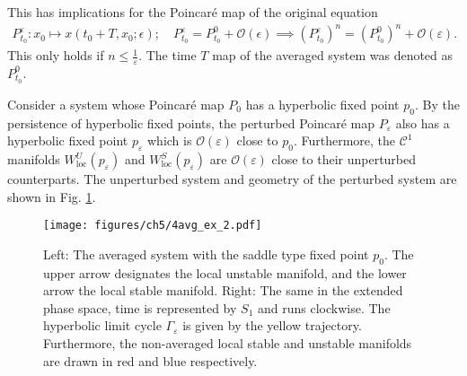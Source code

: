 This has implications for the Poincaré map of the original equation
\begin{align}
	P_{t_0}^{\varepsilon}:x_0 \mapsto x(t_0+T, x_0; \epsilon);\quad P_{t_0}^{\varepsilon} = P_{t_0}^{0} + \mathcal{O}(\epsilon) \implies \left( P_{t_0}^{\varepsilon}\right)^{n} = \left( P_{t_0}^{0}\right)^{n} + \mathcal{O}(\varepsilon).
\end{align}
This only holds if $n \leq \frac{1}{\varepsilon}$. The time $T$ map of the averaged system was denoted as $P_{t_0}^{0}$.

\begin{ex}
	Consider a system whose Poincaré map $P_0$ has a hyperbolic fixed point $p_0$. By the persistence of hyperbolic fixed points, the perturbed Poincaré map $P_\varepsilon$ also has a hyperbolic fixed point $p_\varepsilon$ which is $\mathcal{O}(\varepsilon)$ close to $p_0$. Furthermore, the $\mathcal{C}^{1}$ manifolds $W^{U}_{ \textrm{loc} }(p_\varepsilon)$ and $W^{S}_{ \textrm{loc} }(p_{\varepsilon})$ are $\mathcal{O}(\varepsilon)$ close to their unperturbed counterparts. The unperturbed system and geometry of the perturbed system are shown in Fig. \ref{fig:avg_ex_2}.
	\begin{figure}[h!]
		\centering
		\texttt{[image: figures/ch5/4avg\_ex\_2.pdf]}
		\caption{Left: The averaged system with the saddle type fixed point $p_0$. The upper arrow designates the local unstable manifold, and the lower arrow the local stable manifold. Right: The same in the extended phase space, time is represented by $S_1$ and runs clockwise. The hyperbolic limit cycle $\Gamma_\varepsilon$ is given by the yellow trajectory. Furthermore, the non-averaged local stable and unstable manifolds are drawn in red and blue respectively.}
		\label{fig:avg_ex_2}
	\end{figure}
	
\end{ex}
